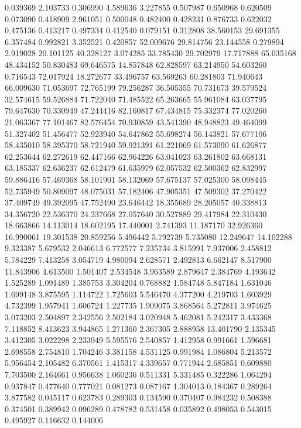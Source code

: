 0.039369
2.103733
0.306990
4.589636
3.227855
0.507987
0.650968
0.620509
0.073090
0.418909
2.961051
0.500048
0.482400
0.428231
0.876733
0.622032
0.475136
0.413217
0.497334
0.412540
0.079151
0.312808
38.560153
29.691355
6.357484
0.992821
3.352521
0.420857
52.009676
29.814756
23.144558
0.279894
2.919028
20.101125
40.328127
3.074285
33.785430
29.702979
17.717888
65.035168
48.434152
50.830483
69.646575
14.857848
62.828597
63.214950
54.603260
0.716543
72.017924
18.272677
33.496757
63.569263
60.281803
71.940643
66.009630
71.053697
72.765199
79.256287
36.505355
70.731673
39.579524
32.574615
59.526884
71.722040
71.485522
65.263665
55.961084
63.037795
79.647630
70.330949
47.244416
82.160817
67.434815
75.332374
77.020260
21.063367
77.101467
82.576454
70.930859
43.541390
48.948823
49.464099
51.327402
51.456477
52.923940
54.647862
55.698274
56.143821
57.677106
58.435010
58.395370
58.721940
59.921391
61.221069
61.573090
61.626877
62.253644
62.272619
62.447166
62.964226
63.041023
63.261802
63.668131
63.185337
62.636237
62.612479
61.635979
62.057532
62.500362
62.832997
59.886416
57.469368
58.101901
58.132069
57.675137
57.025300
58.098445
52.735949
50.809097
48.075031
57.182406
47.905351
47.509302
37.270422
37.409749
49.392095
47.752490
23.646442
18.355689
28.205057
40.338813
34.356720
22.536370
24.237668
27.057640
30.527889
29.417984
22.310430
18.663866
14.113014
18.602195
17.440001
2.741393
11.187170
32.926360
16.990061
19.301538
20.859256
5.496442
5.792739
5.735080
12.249647
14.102288
9.323387
5.679532
2.046613
6.772577
7.235734
3.815991
7.937006
2.458812
5.784229
7.413258
3.054719
4.980094
2.628571
2.492813
6.662147
8.517900
11.843906
4.613500
1.501407
2.534548
3.963589
2.879647
2.384769
4.193642
1.525289
1.091489
1.385753
3.304204
0.768882
1.584748
5.847184
1.631046
1.699148
3.875595
1.114722
1.725603
5.546470
4.377200
4.219703
1.603929
4.732399
1.957941
1.606724
1.227735
1.909075
3.868564
5.272811
3.974625
3.073203
2.504897
2.342556
2.502184
3.020948
5.462081
5.242317
3.433368
7.118852
8.413623
3.944865
1.271360
2.367305
2.888958
13.401790
2.135345
3.412305
3.022298
2.233949
5.595576
2.540857
1.412958
0.991661
1.596681
2.698558
2.754810
1.704246
3.381158
4.531125
0.991984
1.086804
5.213572
5.956454
2.105482
6.370561
1.415317
4.339657
0.771944
2.685851
0.609880
7.703500
2.164661
0.956638
1.060236
0.511331
5.331485
0.322286
1.064294
0.937847
0.477640
0.777021
0.081273
0.087167
1.304013
0.184367
0.289264
3.877582
0.045117
0.623783
0.289303
0.134590
0.370407
0.984232
0.508388
0.374501
0.389942
0.096289
0.478782
0.531458
0.035892
0.498053
0.543015
0.495927
0.116632
0.144006

